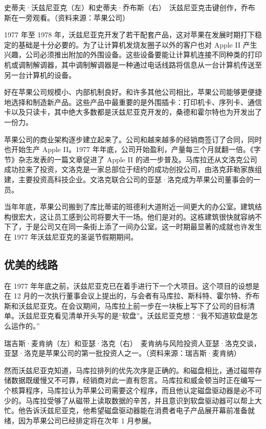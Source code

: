 \documentclass[12pt,UTF8]{ctexbook}
\begin{document}
史蒂夫·沃兹尼亚克（左）和史蒂夫·乔布斯（右）　沃兹尼亚克击键创作，乔布斯在一旁观看。（资料来源：苹果公司）

1977 年至 1978 年，沃兹尼亚克开发了若干配套产品，这对苹果在发展时期打下稳定的基础是十分必要的。为了让计算机发烧友圈子以外的客户也对 Apple II 产生兴趣，公司必须推出附加的外围设备。这些设备要能让计算机连接不同种类的打印机或调制解调器，其中调制解调器是一种通过电话线路将信息从一台计算机传送至另一台计算机的设备。

好在苹果公司规模小、内部机制良好。和许多其他公司相比，苹果公司能够更便捷地选择和制造新产品。这些产品中最重要的是外围插卡：打印机卡、序列卡、通信卡以及只读卡，其中绝大多数都是沃兹尼亚克开发的，桑德和霍尔特也为开发出了一份力。

苹果公司的商业架构逐步建立起来了。公司和越来越多的经销商签订了合同，同时也开始生产 Apple II。1977 年年底，公司开始盈利，产量每三个月就翻一倍。《字节》杂志发表的一篇文章促进了 Apple II 的进一步普及。马库拉还从文洛克公司成功拉来了投资，文洛克是一家总部位于纽约的成功创投公司，由洛克菲勒家族组建，主要投资高科技企业。文洛克联合公司的亚瑟·洛克成为苹果公司董事会的一员。

当年年底，苹果公司搬到了库比蒂诺的班德利大道附近一间更大的办公室。建筑结构很宏大，这让员工感到公司将要大干一场。他们是对的。这栋建筑很快就容纳不下了，于是公司又在同一条街上添了一间办公室。这一时期最显著的成就也许发生在 1977 年沃兹尼亚克的圣诞节假期期间。





\subsection{优美的线路}


在 1977 年年底之前，沃兹尼亚克已在着手进行下一个大项目。这个项目的设想是在 12 月的一次执行董事会议上提出的，与会者有马库拉、斯科特、霍尔特、乔布斯和沃兹尼亚克。在会议期间，马库拉上前一步在一块板上写下了公司的目标清单。沃兹尼亚克看见清单开头写的是“软盘”。沃兹尼亚克想：“我不知道软盘是怎么运作的。”



瑞吉斯·麦肯纳（左）和亚瑟·洛克（右）　麦肯纳与风险投资人亚瑟·洛克交谈，亚瑟·洛克是苹果公司的第一批投资人之一。（资料来源：瑞吉斯·麦肯纳）

然而沃兹尼亚克知道，马库拉排列的优先次序是正确的。和磁盘相比，通过磁带存储数据既缓慢又不可靠，经销商对此一直有怨言。马库拉和威金顿当时正在编写一个核算程序，马库拉认为苹果公司需要这个程序，而且他认定磁盘驱动器是必不可少的。马库拉受够了从磁带上读取数据的辛苦，并且意识到软盘驱动器可以帮上大忙。他告诉沃兹尼亚克，他希望磁盘驱动器能在消费者电子产品展开幕前准备就绪，因为苹果公司已经排定将在次年 1 月参展。
\end{document}
